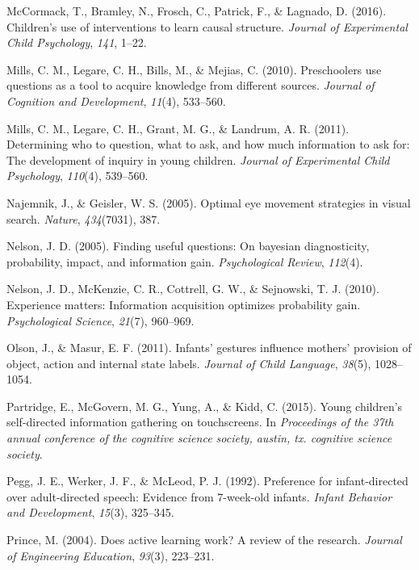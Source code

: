 \documentclass[a4paper,man,apacite,floatsintext]{apa6}
\begin{document}
\hypertarget{ref-mccormack2016children}{}
McCormack, T., Bramley, N., Frosch, C., Patrick, F., \& Lagnado, D.
(2016). Children's use of interventions to learn causal structure.
\emph{Journal of Experimental Child Psychology}, \emph{141}, 1--22.

\hypertarget{ref-mills2010preschoolers}{}
Mills, C. M., Legare, C. H., Bills, M., \& Mejias, C. (2010).
Preschoolers use questions as a tool to acquire knowledge from different
sources. \emph{Journal of Cognition and Development}, \emph{11}(4),
533--560.

\hypertarget{ref-mills2011determining}{}
Mills, C. M., Legare, C. H., Grant, M. G., \& Landrum, A. R. (2011).
Determining who to question, what to ask, and how much information to
ask for: The development of inquiry in young children. \emph{Journal of
Experimental Child Psychology}, \emph{110}(4), 539--560.

\hypertarget{ref-najemnik2005optimal}{}
Najemnik, J., \& Geisler, W. S. (2005). Optimal eye movement strategies
in visual search. \emph{Nature}, \emph{434}(7031), 387.

\hypertarget{ref-nelson2005finding}{}
Nelson, J. D. (2005). Finding useful questions: On bayesian
diagnosticity, probability, impact, and information gain.
\emph{Psychological Review}, \emph{112}(4).

\hypertarget{ref-nelson2010experience}{}
Nelson, J. D., McKenzie, C. R., Cottrell, G. W., \& Sejnowski, T. J.
(2010). Experience matters: Information acquisition optimizes
probability gain. \emph{Psychological Science}, \emph{21}(7), 960--969.

\hypertarget{ref-olson2011infants}{}
Olson, J., \& Masur, E. F. (2011). Infants' gestures influence mothers'
provision of object, action and internal state labels. \emph{Journal of
Child Language}, \emph{38}(5), 1028--1054.

\hypertarget{ref-partridge2015young}{}
Partridge, E., McGovern, M. G., Yung, A., \& Kidd, C. (2015). Young
children's self-directed information gathering on touchscreens. In
\emph{Proceedings of the 37th annual conference of the cognitive science
society, austin, tx. cognitive science society}.

\hypertarget{ref-pegg1992preference}{}
Pegg, J. E., Werker, J. F., \& McLeod, P. J. (1992). Preference for
infant-directed over adult-directed speech: Evidence from 7-week-old
infants. \emph{Infant Behavior and Development}, \emph{15}(3), 325--345.

\hypertarget{ref-prince2004does}{}
Prince, M. (2004). Does active learning work? A review of the research.
\emph{Journal of Engineering Education}, \emph{93}(3), 223--231.
\end{document}
